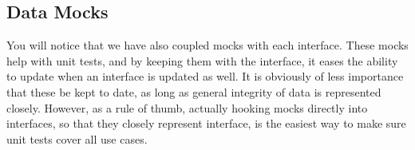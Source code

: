 

\subsection{Data Mocks}
You will notice that we have also coupled mocks with each interface. These mocks
help with unit tests, and by keeping them with the interface, it eases the
ability to update when an interface is updated as well. It is obviously of less
importance that these be kept to date, as long as general integrity of data
is represented closely. However, as a rule of thumb, actually hooking mocks
directly into interfaces, so that they closely represent interface, is the
easiest way to make sure unit tests cover all use cases.
